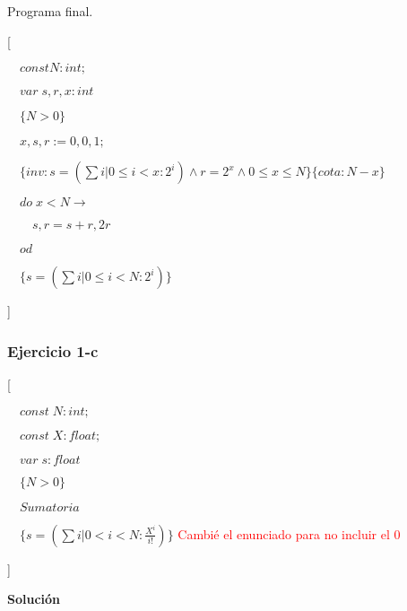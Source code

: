 \documentclass[hidelinks]{article}
\begin{document}
\newpage

Programa final. \par

[\par
	$\quad const N: int;$\par
	$\quad var \; s,r,x: int$\par
	$\quad\{N > 0\}$\par
	$\quad x,s,r := 0,0,1;$\par
	$\quad\{inv: s = (\sum i| 0\leq i < x :2^i) \land r = 2^x \land 0 \leq x \leq N\}\{cota: N-x\}$\par
	$\quad do \; x < N \rightarrow $ \par
	$\qquad s,r = s + r,2r $ \par
	$\quad od $ \par
	$\quad \{s = (\sum i| 0\leq i < N :2^i)\}$ \par
]

\newpage


\subsubsection{Ejercicio 1-c}

[\par
	$\quad const \; N: int;$\par
	$\quad const \; X: float;$\par
	$\quad var \; s: float$\par
	$\quad\{N > 0\}$\par
	$\quad Sumatoria $ \par
	$\quad \{s = (\sum i| 0 < i < N : \frac{X^i}{i!})\}$ \textcolor{red}{Cambié el enunciado para no incluir el 0} \par
]

\textbf{Solución}
\end{document}
